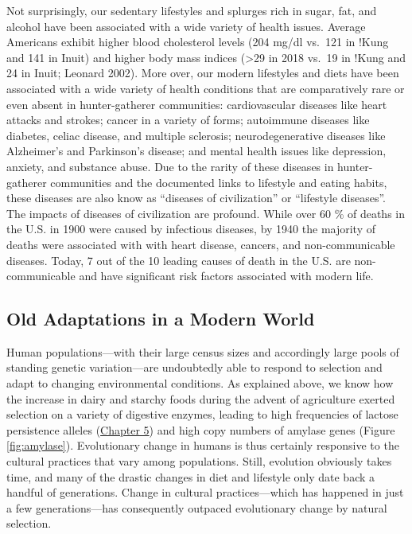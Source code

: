 \documentclass[
]{book}
\begin{document}
Not surprisingly, our sedentary lifestyles and splurges rich in sugar, fat, and alcohol have been associated with a wide variety of health issues. Average Americans exhibit higher blood cholesterol levels (204 mg/dl vs.~121 in !Kung and 141 in Inuit) and higher body mass indices (\textgreater29 in 2018 vs.~19 in !Kung and 24 in Inuit; Leonard 2002). More over, our modern lifestyles and diets have been associated with a wide variety of health conditions that are comparatively rare or even absent in hunter-gatherer communities: cardiovascular diseases like heart attacks and strokes; cancer in a variety of forms; autoimmune diseases like diabetes, celiac disease, and multiple sclerosis; neurodegenerative diseases like Alzheimer's and Parkinson's disease; and mental health issues like depression, anxiety, and substance abuse. Due to the rarity of these diseases in hunter-gatherer communities and the documented links to lifestyle and eating habits, these diseases are also know as ``diseases of civilization'' or ``lifestyle diseases''. The impacts of diseases of civilization are profound. While over 60 \% of deaths in the U.S. in 1900 were caused by infectious diseases, by 1940 the majority of deaths were associated with with heart disease, cancers, and non-communicable diseases. Today, 7 out of the 10 leading causes of death in the U.S. are non-communicable and have significant risk factors associated with modern life.

\hypertarget{old-adaptations-in-a-modern-world}{%
\subsection{Old Adaptations in a Modern World}\label{old-adaptations-in-a-modern-world}}

Human populations---with their large census sizes and accordingly large pools of standing genetic variation---are undoubtedly able to respond to selection and adapt to changing environmental conditions. As explained above, we know how the increase in dairy and starchy foods during the advent of agriculture exerted selection on a variety of digestive enzymes, leading to high frequencies of lactose persistence alleles (\href{evolutionary-mechanisms-i-modeling-selection.html\#fig:lactase}{Chapter 5}) and high copy numbers of amylase genes (Figure \ref{fig:amylase}). Evolutionary change in humans is thus certainly responsive to the cultural practices that vary among populations. Still, evolution obviously takes time, and many of the drastic changes in diet and lifestyle only date back a handful of generations. Change in cultural practices---which has happened in just a few generations---has consequently outpaced evolutionary change by natural selection.
\end{document}
